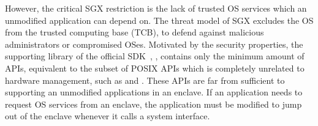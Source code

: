 

However, the critical SGX restriction is
the lack of trusted OS services which an unmodified application can depend on.
The threat model of SGX excludes the OS from
the trusted computing base (TCB),
to defend against malicious administrators or compromised OSes.
Motivated by the security properties,
the supporting library of the official SDK~\cite{intel-sgx-sdk}, , contains only the minimum amount of APIs, equivalent to the subset of POSIX APIs which is completely unrelated to hardware management, 
such as  and .
These APIs are far from sufficient to supporting an unmodified applications in an enclave. 
If an application needs to request OS services from an enclave,
the application must be modified
to jump out of the enclave
whenever it calls a system interface. %


